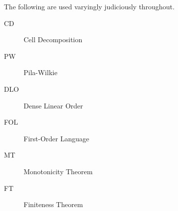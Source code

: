%
%


The following are used varyingly judiciously throughout.
\begin{description}
\item[CD]{Cell Decomposition}
\item[PW]{Pila-Wilkie}
\item[DLO]{Dense Linear Order}
\item[FOL]{First-Order Language}
\item[MT]{Monotonicity Theorem}
\item[FT]{Finiteness Theorem}
\end{description}
